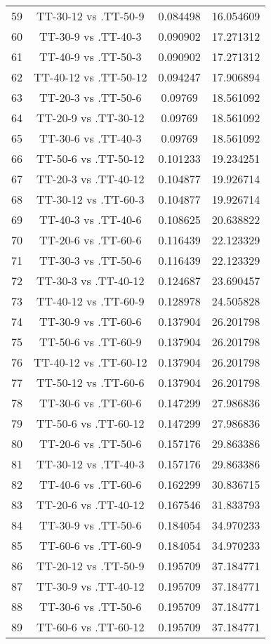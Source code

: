 \documentclass[a4paper,10pt]{article}
\begin{document}
\begin{landscape}
\begin{table}[!htp]
\begin{tabular}{cccc}
59&TT-30-12 vs .TT-50-9&0.084498&16.054609\\
60&TT-30-9 vs .TT-40-3&0.090902&17.271312\\
61&TT-40-9 vs .TT-50-3&0.090902&17.271312\\
62&TT-40-12 vs .TT-50-12&0.094247&17.906894\\
63&TT-20-3 vs .TT-50-6&0.09769&18.561092\\
64&TT-20-9 vs .TT-30-12&0.09769&18.561092\\
65&TT-30-6 vs .TT-40-3&0.09769&18.561092\\
66&TT-50-6 vs .TT-50-12&0.101233&19.234251\\
67&TT-20-3 vs .TT-40-12&0.104877&19.926714\\
68&TT-30-12 vs .TT-60-3&0.104877&19.926714\\
69&TT-40-3 vs .TT-40-6&0.108625&20.638822\\
70&TT-20-6 vs .TT-60-6&0.116439&22.123329\\
71&TT-30-3 vs .TT-50-6&0.116439&22.123329\\
72&TT-30-3 vs .TT-40-12&0.124687&23.690457\\
73&TT-40-12 vs .TT-60-9&0.128978&24.505828\\
74&TT-30-9 vs .TT-60-6&0.137904&26.201798\\
75&TT-50-6 vs .TT-60-9&0.137904&26.201798\\
76&TT-40-12 vs .TT-60-12&0.137904&26.201798\\
77&TT-50-12 vs .TT-60-6&0.137904&26.201798\\
78&TT-30-6 vs .TT-60-6&0.147299&27.986836\\
79&TT-50-6 vs .TT-60-12&0.147299&27.986836\\
80&TT-20-6 vs .TT-50-6&0.157176&29.863386\\
81&TT-30-12 vs .TT-40-3&0.157176&29.863386\\
82&TT-40-6 vs .TT-60-6&0.162299&30.836715\\
83&TT-20-6 vs .TT-40-12&0.167546&31.833793\\
84&TT-30-9 vs .TT-50-6&0.184054&34.970233\\
85&TT-60-6 vs .TT-60-9&0.184054&34.970233\\
86&TT-20-12 vs .TT-50-9&0.195709&37.184771\\
87&TT-30-9 vs .TT-40-12&0.195709&37.184771\\
88&TT-30-6 vs .TT-50-6&0.195709&37.184771\\
89&TT-60-6 vs .TT-60-12&0.195709&37.184771\\

\end{tabular}
\end{table}
\end{landscape}
\end{document}
